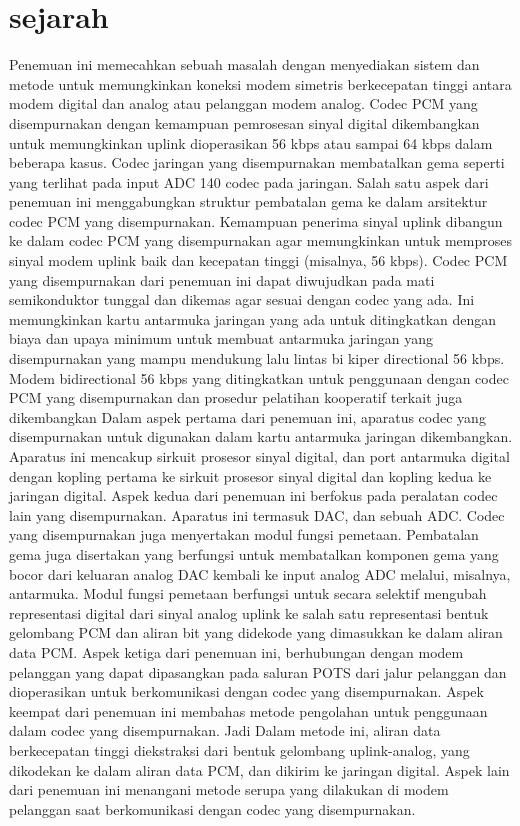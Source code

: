 \section{sejarah}
Penemuan ini memecahkan sebuah masalah dengan menyediakan sistem dan metode untuk memungkinkan koneksi modem simetris berkecepatan tinggi antara modem digital dan analog atau pelanggan modem analog. Codec PCM yang disempurnakan dengan kemampuan pemrosesan sinyal digital dikembangkan untuk memungkinkan uplink dioperasikan 56 kbps atau sampai 64 kbps dalam beberapa kasus. Codec jaringan yang disempurnakan membatalkan gema seperti yang terlihat pada input ADC 140 codec pada jaringan. Salah satu aspek dari penemuan ini menggabungkan struktur pembatalan gema ke dalam arsitektur codec PCM yang disempurnakan. Kemampuan penerima sinyal uplink dibangun ke dalam codec PCM yang disempurnakan agar memungkinkan untuk memproses sinyal modem uplink baik dan kecepatan tinggi (misalnya, 56 kbps). Codec PCM yang disempurnakan dari penemuan ini dapat diwujudkan pada mati semikonduktor tunggal dan dikemas agar sesuai dengan codec yang ada. Ini memungkinkan kartu antarmuka jaringan yang ada untuk ditingkatkan dengan biaya dan upaya minimum untuk membuat antarmuka jaringan yang disempurnakan yang mampu mendukung lalu lintas bi kiper directional 56 kbps. Modem bidirectional 56 kbps yang ditingkatkan untuk penggunaan dengan codec PCM yang disempurnakan dan prosedur pelatihan kooperatif terkait juga dikembangkan
Dalam aspek pertama dari penemuan ini, aparatus codec yang disempurnakan untuk digunakan dalam kartu antarmuka jaringan dikembangkan. Aparatus ini mencakup sirkuit prosesor sinyal digital, dan port antarmuka digital dengan kopling pertama ke sirkuit prosesor sinyal digital dan kopling kedua ke jaringan digital.
Aspek kedua dari penemuan ini berfokus pada peralatan codec lain yang disempurnakan. Aparatus ini termasuk DAC, dan sebuah ADC. Codec yang disempurnakan juga menyertakan modul fungsi pemetaan. Pembatalan gema juga disertakan yang berfungsi untuk membatalkan komponen gema yang bocor dari keluaran analog DAC kembali ke input analog ADC melalui, misalnya, antarmuka. Modul fungsi pemetaan berfungsi untuk secara selektif mengubah representasi digital dari sinyal analog uplink ke salah satu representasi bentuk gelombang PCM dan aliran bit yang didekode yang dimasukkan ke dalam aliran data PCM.
Aspek ketiga dari penemuan ini, berhubungan dengan modem pelanggan yang dapat dipasangkan pada saluran POTS dari jalur pelanggan dan dioperasikan untuk berkomunikasi dengan codec yang disempurnakan.
Aspek keempat dari penemuan ini membahas metode pengolahan untuk penggunaan dalam codec yang disempurnakan.
Jadi Dalam metode ini, aliran data berkecepatan tinggi diekstraksi dari bentuk gelombang uplink-analog, yang dikodekan ke dalam aliran data PCM, dan dikirim ke jaringan digital. Aspek lain dari penemuan ini menangani metode serupa yang dilakukan di modem pelanggan saat berkomunikasi dengan codec yang disempurnakan.

